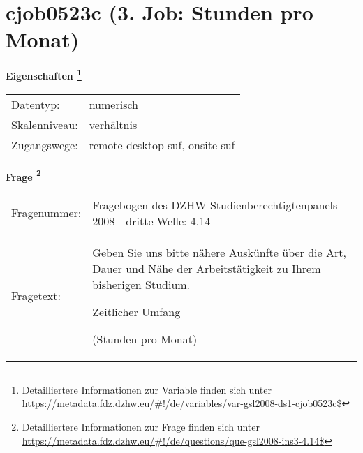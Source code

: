 
    \setcounter{footnote}{0}

    \vspace*{-1.8cm}
	\section{cjob0523c (3. Job: Stunden pro Monat)}
	\label{section:cjob0523c}



    \vspace*{0.5cm}
    \noindent\textbf{Eigenschaften
	\footnote{Detailliertere Informationen zur Variable finden sich unter
		\url{https://metadata.fdz.dzhw.eu/\#!/de/variables/var-gsl2008-ds1-cjob0523c$}}}\\
	\begin{tabularx}{\hsize}{@{}lX}
	Datentyp: & numerisch \\
	Skalenniveau: & verhältnis \\
	Zugangswege: &
	  remote-desktop-suf, 
	  onsite-suf
 \\
    \end{tabularx}



				\vspace*{0.5cm}
                \noindent\textbf{Frage
	                \footnote{Detailliertere Informationen zur Frage finden sich unter
		              \url{https://metadata.fdz.dzhw.eu/\#!/de/questions/que-gsl2008-ins3-4.14$}}}\\
				\begin{tabularx}{\hsize}{@{}lX}
					Fragenummer: &
					  Fragebogen des DZHW-Studienberechtigtenpanels 2008 - dritte Welle:
					  4.14
 \\
					Fragetext: & Geben Sie uns bitte nähere Auskünfte über die Art, Dauer und Nähe der Arbeitstätigkeit zu Ihrem bisherigen Studium.\par  Zeitlicher Umfang\par  (Stunden pro Monat) \\
				\end{tabularx}





